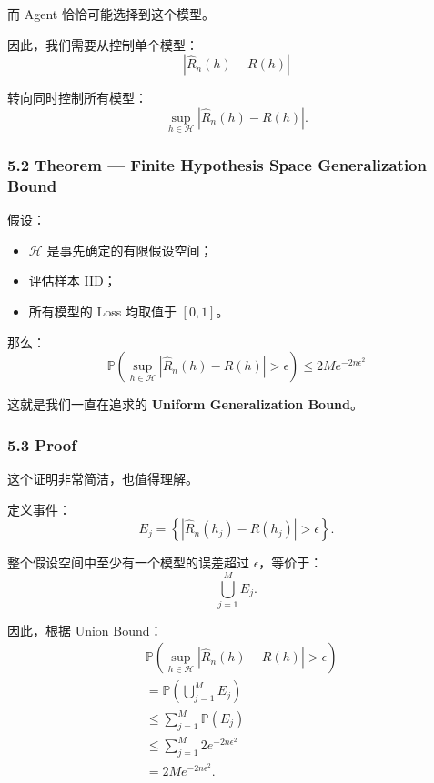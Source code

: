 而 Agent 恰恰可能选择到这个模型。

因此，我们需要从控制单个模型：
\[|\widehat R_n(h)-R(h)|\]

转向同时控制所有模型：
\[\sup_{h\in\mathcal H}
|\widehat R_n(h)-R(h)|.\]

\hypertarget{part-2-14-0001-theorem-finite-hypothesis-space-generalization-bound}{%
\subsubsection{5.2 Theorem --- Finite Hypothesis Space Generalization Bound}\label{part-2-14-0001-theorem-finite-hypothesis-space-generalization-bound}}

假设：

\begin{itemize}
\tightlist
\item
  \(\mathcal H\) 是事先确定的有限假设空间；
\item
  评估样本 IID；
\item
  所有模型的 Loss 均取值于 \([0,1]\)。
\end{itemize}

那么：
\[\boxed{
\mathbb P
\left(
\sup_{h\in\mathcal H}
|\widehat R_n(h)-R(h)|>\epsilon
\right)
\leq
2Me^{-2n\epsilon^2}
}\]

这就是我们一直在追求的 \textbf{Uniform Generalization Bound}。

\hypertarget{part-2-14-0001-proof}{%
\subsubsection{5.3 Proof}\label{part-2-14-0001-proof}}

这个证明非常简洁，也值得理解。

定义事件：
\[E_j=
\left\{
|\widehat R_n(h_j)-R(h_j)|>\epsilon
\right\}.\]

整个假设空间中至少有一个模型的误差超过 \(\epsilon\)，等价于：
\[\bigcup_{j=1}^{M}E_j.\]

因此，根据 Union Bound：
\[\begin{aligned}
&\mathbb P
\left(
\sup_{h\in\mathcal H}
|\widehat R_n(h)-R(h)|>\epsilon
\right)\\
&=
\mathbb P\left(\bigcup_{j=1}^{M}E_j\right)\\
&\leq
\sum_{j=1}^{M}\mathbb P(E_j)\\
&\leq
\sum_{j=1}^{M}2e^{-2n\epsilon^2}\\
&=
2Me^{-2n\epsilon^2}.
\end{aligned}\]


